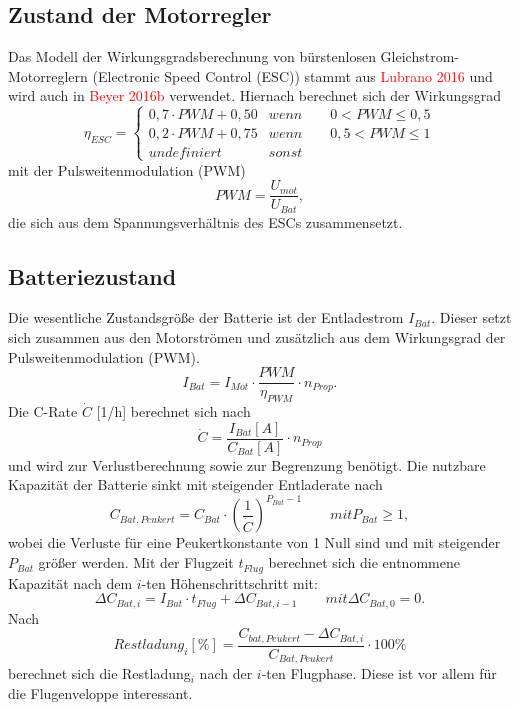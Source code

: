 \subsection{Zustand der Motorregler}
Das Modell der Wirkungsgradsberechnung von bürstenlosen Gleichstrom-Motorreglern (Electronic Speed Control (ESC)) stammt aus \textcolor{red}{Lubrano 2016} und wird auch in \textcolor{red}{Beyer 2016b} verwendet. Hiernach berechnet sich der Wirkungsgrad 
\begin{equation}
\eta_{ESC} = \begin{cases} 
0,7\cdot PWM + 0,50 & wenn \qquad 0 < PWM \leq 0,5 \\ 
0,2\cdot PWM + 0,75 & wenn \qquad 0,5 < PWM \leq 1 \\ 
undefiniert & sonst 
\end{cases}
\end{equation} 
mit der Pulsweitenmodulation (PWM) 
\begin{equation}
	PWM = \frac{U_{mot}}{U_{Bat}},
\end{equation}
die sich aus dem Spannungsverhältnis des ESCs zusammensetzt.


\subsection{Batteriezustand}
Die wesentliche Zustandsgröße der Batterie ist der Entladestrom \ensuremath{I_{Bat}}. Dieser setzt sich zusammen aus den Motorströmen und zusätzlich aus dem Wirkungsgrad der Pulsweitenmodulation (PWM).
\begin{equation}
	I_{Bat} = I_{Mot}\cdot \frac{PWM}{\eta_{PWM}}\cdot n_{Prop}.
\end{equation}
Die C-Rate \ensuremath{\dot{C}} [1/h] berechnet sich nach 
\begin{equation}
	\dot{C} = \frac{I_{Bat}[A]}{C_{Bat}[A]}\cdot n_{Prop}
\end{equation}
und wird zur Verlustberechnung sowie zur Begrenzung benötigt. Die nutzbare Kapazität der Batterie sinkt mit steigender Entladerate nach
\begin{equation}
	C_{Bat,Peukert} = C_{Bat}\cdot (\frac{1}{\dot{C}})^{P_{Bat}-1} 
	\qquad mit P_{Bat} \geq 1,
\end{equation}
wobei die Verluste für eine Peukertkonstante von 1 Null sind und mit steigender \ensuremath{P_{Bat}} größer werden.
Mit der Flugzeit \ensuremath{t_{Flug}} berechnet sich die entnommene Kapazität nach dem \ensuremath{i}-ten Höhenschrittschritt mit: 
\begin{equation}
	\Delta C_{Bat,i} = I_{Bat}\cdot t_{Flug} + \Delta C_{Bat,i-1} 
	\qquad mit \Delta C_{Bat,0} = 0.
\end{equation}
Nach
\begin{equation}
	Restladung_i[\%] = \frac{C_{bat,Peukert}-\Delta C_{Bat,i}}{C_{Bat,Peukert}}\cdot 100\%
\end{equation}
berechnet sich die Restladung$_{i}$ nach der \ensuremath{i}-ten Flugphase. Diese ist vor allem für die Flugenveloppe interessant.


